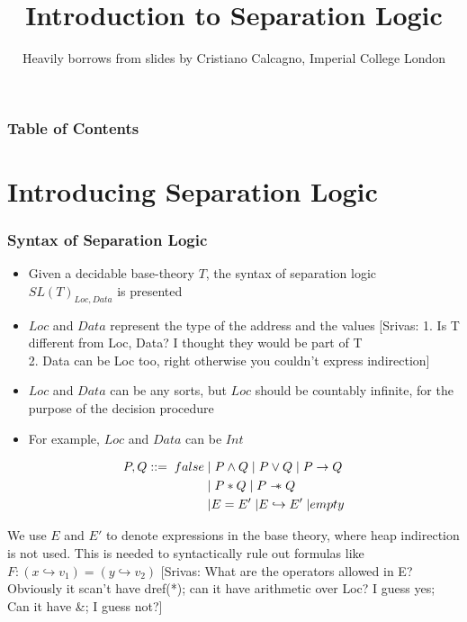 \documentclass{beamer}
\title %
{Introduction to Separation Logic}
\author[\footnote{Heavily}]%
{Heavily borrows from slides by Cristiano Calcagno, Imperial College London}
\newcommand\sepimp{\mathrel{-\mkern-6mu*}}
\newcommand{\mscmt}[1]{{\color{blue} [Srivas: {#1}]}}
\begin{document}
\frame{\titlepage}



\begin{frame}
\frametitle{Table of Contents}
\tableofcontents
\end{frame}


\section{Introducing Separation Logic}

\begin{frame}
\frametitle{Syntax of Separation Logic}
\begin{itemize}
\item Given a decidable base-theory $T$, the syntax of separation logic $SL(T)_{Loc,Data}$ is presented
\item $Loc$ and $Data$ represent the type of the address and the values
\mscmt{\tiny{1. Is T different from Loc, Data?  I thought they would be part of T \\
2. Data can be Loc too, right otherwise you couldn't express indirection}}
\item $Loc$ and $Data$ can be any sorts, but $Loc$ should be countably
    infinite, for the purpose of the decision procedure
\item For example, $Loc$ and $Data$ can be $Int$
\end{itemize}

\begin{align*}
    P,Q ::= \; false \;
          & \lvert \; P \land Q \;
          \lvert \; P \lor Q \;
          \lvert \; P \to Q \\
          & \lvert \; P * Q \;
            \lvert \; P \sepimp Q \\
          & \lvert E = E' \;
            \lvert E \hookrightarrow E' \;
            \lvert empty
\end{align*}

We use $E$ and $E'$ to denote expressions in the base theory,
where heap indirection is not used. This is needed to syntactically
rule out formulas like $F : (x \hookrightarrow v_1) = (y \hookrightarrow v_2)$
\mscmt{\tiny{What are the operators allowed in E?  Obviously it scan't have dref(*); can it have arithmetic over Loc?  I guess yes;
Can it have \&; I guess not?}}
\end{frame}
\end{document}
